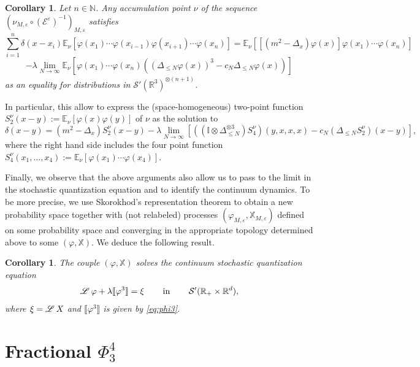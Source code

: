 \documentclass[a4paper,11pt]{article}
\newcommand{\assign}{:=}
\newcommand{\tmop}[1]{\ensuremath{\operatorname{#1}}}
\newtheorem{corollary}[theorem]{Corollary}
{\theorembodyfont{\rmfamily}\newtheorem{remark}[theorem]{Remark}}
\numberwithin{equation}{section}
\newcommand{\LL}{\mathscr{L} \hspace{.2em}}
\begin{document}
\begin{corollary}
  \label{cor:SD}Let $n \in \mathbb{N}$. Any accumulation point $\nu$ of the
  sequence $(\nu_{M, \varepsilon} \circ (\mathcal{E}^{\varepsilon})^{- 1})_{M,
  \varepsilon}$ satisfies
  \[ \sum_{i = 1}^n \delta (x - x_i) \mathbb{E}_{\nu} [\varphi (x_1) \cdots
     \varphi (x_{i - 1}) \varphi (x_{i + 1}) \cdots \varphi (x_n)]
     =\mathbb{E}_{\nu} [[(m^2 - \Delta_x) \varphi (x)] \varphi (x_1) \cdots
     \varphi (x_n)] \]
  \[ - \lambda \lim_{N \rightarrow \infty} \mathbb{E}_{\nu} [\varphi (x_1) \cdots
     \varphi (x_n) ((\Delta_{\leqslant N} \varphi (x))^3 - c_N
     \Delta_{\leqslant N} \varphi (x))]_{} \]
  as an equality for distributions in $\mathcal{S}' (\mathbb{R}^3)^{\otimes (n
  + 1)}$.
\end{corollary}

In particular, this allow to express the (space-homogeneous) two-point
function $S_{2}^{\nu} (x - y) \assign \mathbb{E}_{\nu} [\varphi (x) \varphi
(y)]$ of $\nu$ as the solution to
\[ \delta (x - y) = (m^2 - \Delta_x) S^{\nu}_{2} (x - y) -\lambda \lim_{N \rightarrow
   \infty} [((\mathbb{I} \otimes \Delta_{\leqslant N}^{\otimes 3}) S^{\nu}_{4})
   (y, x, x, x) - c_N (\Delta_{\leqslant N} S^{\nu}_{2}) (x - y)], \]
where the right hand side includes the  four point function $S^{\nu}_{4}
(x_1, \ldots, x_4) \assign \mathbb{E}_{\nu} [\varphi (x_1) \cdots \varphi
(x_4)].$

Finally, we observe that the above arguments also allow us to pass to the
limit in the stochastic quantization equation and to identify the continuum
dynamics. To be more precise, we use Skorokhod's representation theorem to
obtain a new probability space together with (not relabeled) processes
$(\varphi_{M, \varepsilon}, \mathbb{X}_{M, \varepsilon})$ defined on some
probability space and converging in the appropriate topology determined above
to some $(\varphi, \mathbb{X})$. We deduce the following result.

\begin{corollary}
The couple $(\varphi, \mathbb{X})$ solves the continuum stochastic quantization
equation
\[ \LL \varphi +\lambda \llbracket \varphi^3 \rrbracket = \xi
   \qquad \tmop{in} \qquad \mathcal{S}' (\mathbb{R}_+ \times \mathbb{R}^d), \]
where $\xi = \LL X$ and $\llbracket \varphi^3 \rrbracket$ is given by
{\eqref{eq:phi3}}.
\end{corollary}



\section{Fractional $\Phi^4_3$}
\label{sec:fractional}
\end{document}
